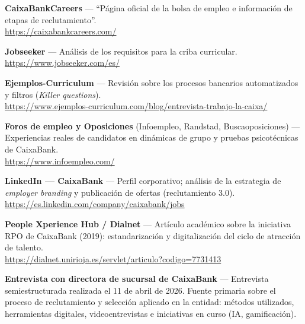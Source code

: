 \begin{enumerate}[label={[\arabic*]}]

  \item \textbf{CaixaBankCareers} --- ``Página oficial de la bolsa de empleo e información de etapas de reclutamiento''.\\
        \url{https://caixabankcareers.com/}

  \item \textbf{Jobseeker} --- Análisis de los requisitos para la criba curricular.\\
        \url{https://www.jobseeker.com/es/}

  \item \textbf{Ejemplos-Curriculum} --- Revisión sobre los procesos bancarios automatizados y filtros (\textit{Killer questions}).\\
        \url{https://www.ejemplos-curriculum.com/blog/entrevista-trabajo-la-caixa/}

  \item \textbf{Foros de empleo y Oposiciones} (Infoempleo, Randstad, Buscaoposiciones) --- Experiencias reales de candidatos en dinámicas de grupo y pruebas psicotécnicas de CaixaBank.\\
        \url{https://www.infoempleo.com/}
  \item \textbf{LinkedIn --- CaixaBank} --- Perfil corporativo; análisis de la estrategia de \textit{employer branding} y publicación de ofertas (reclutamiento 3.0).\\
        \url{https://es.linkedin.com/company/caixabank/jobs}

  \item \textbf{People Xperience Hub / Dialnet} --- Artículo académico sobre la iniciativa RPO de CaixaBank (2019): estandarización y digitalización del ciclo de atracción de talento.\\
        \url{https://dialnet.unirioja.es/servlet/articulo?codigo=7731413}

  \item \textbf{Entrevista con directora de sucursal de CaixaBank} --- Entrevista semiestructurada realizada el 11 de abril de 2026. Fuente primaria sobre el proceso de reclutamiento y selección aplicado en la entidad: métodos utilizados, herramientas digitales, videoentrevistas e iniciativas en curso (IA, gamificación).

\end{enumerate}


